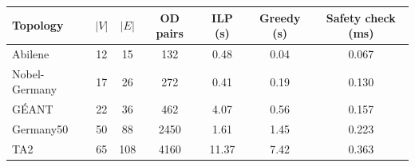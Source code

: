 \begin{tabular}{@{}lcccccc@{}}
\toprule
Topology & $|V|$ & $|E|$ & OD pairs & ILP (s) & Greedy (s) & Safety check (ms) \\
\midrule
Abilene & 12 & 15 & 132 & 0.48 & 0.04 & 0.067 \\
Nobel-Germany & 17 & 26 & 272 & 0.41 & 0.19 & 0.130 \\
G\'{E}ANT & 22 & 36 & 462 & 4.07 & 0.56 & 0.157 \\
Germany50 & 50 & 88 & 2450 & 1.61 & 1.45 & 0.223 \\
TA2 & 65 & 108 & 4160 & 11.37 & 7.42 & 0.363 \\
\bottomrule
\end{tabular}
